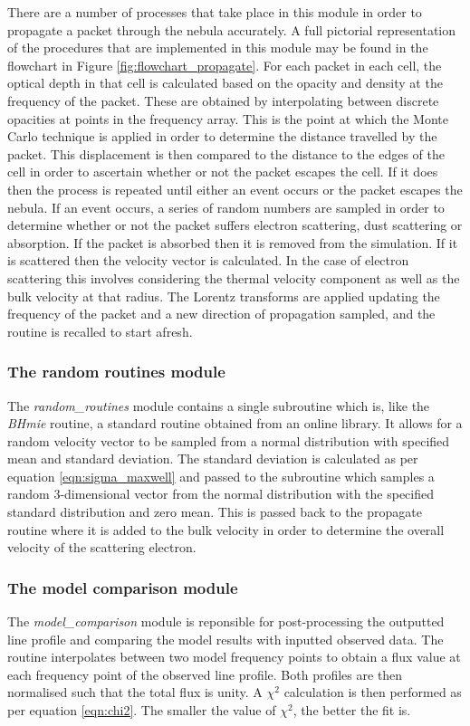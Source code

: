 		There are a number of processes that take place in this module in order to propagate a packet through the nebula accurately.  A full pictorial representation of the procedures that are implemented in this module may be found in the flowchart in Figure \ref{fig:flowchart_propagate}. For each packet in each cell, the optical depth in that cell is calculated based on the opacity and density at the frequency of the packet.  These are obtained by interpolating between discrete opacities at points in the frequency array.  This is the point at which the Monte Carlo technique is applied in order to determine the distance travelled by the packet.  This displacement is then compared to the distance to the edges of the cell in order to ascertain whether or not the packet escapes the cell.  If it does then the process is repeated until either an event occurs or the packet escapes the nebula.  If an event occurs, a series of random numbers are sampled in order to determine whether or not the packet suffers electron scattering, dust scattering or absorption.  If the packet is absorbed then it is removed from the simulation.  If it is scattered then the velocity vector is calculated.  In the case of electron scattering this involves considering the thermal velocity component as well as the bulk velocity at that radius.  The Lorentz transforms are applied updating the frequency of the packet and a new direction of propagation sampled, and the routine is recalled to start afresh. 
	
		\subsubsection{The random routines module}
		The \textit{random\_routines} module contains a single subroutine which is, like the \textit{BHmie} routine, a standard routine obtained from an online library.  It allows for a random velocity vector to be sampled from a normal distribution with specified mean and standard deviation.  The standard deviation is calculated as per equation \ref{eqn:sigma_maxwell} and passed to the subroutine which samples a random 3-dimensional vector from the normal distribution with the specified standard distribution and zero mean.  This is passed back to the propagate routine where it is added to the bulk velocity in order to determine the overall velocity of the scattering electron.
		
		\subsubsection{The model comparison module}
		The \textit{model\_comparison} module is reponsible for post-processing the outputted line profile and comparing the model results with inputted observed data.  The routine interpolates between two model frequency points to obtain a flux value at each frequency point of the observed line profile.  Both profiles are then normalised such that the total flux is unity.  A $\chi^2$ calculation is then performed as per equation \ref{eqn:chi2}. The smaller the value of $\chi^2$, the better the fit is.
		
